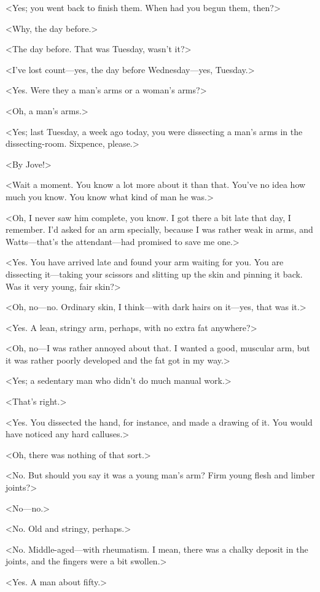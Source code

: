 <Yes; you went back to finish them. When had you begun them, then?>

<Why, the day before.>

<The day before. That was Tuesday, wasn't it?>

<I've lost count—yes, the day before Wednesday—yes, Tuesday.>

<Yes. Were they a man's arms or a woman's arms?>

<Oh, a man's arms.>

<Yes; last Tuesday, a week ago today, you were dissecting a man's arms in the dissecting-room. Sixpence, please.>

<By Jove!>

<Wait a moment. You know a lot more about it than that. You've no idea how much you know. You know what kind of man he was.>

<Oh, I never saw him complete, you know. I got there a bit late that day, I remember. I'd asked for an arm specially, because I was rather weak in arms, and Watts—that's the attendant—had promised to save me one.>

<Yes. You have arrived late and found your arm waiting for you. You are dissecting it—taking your scissors and slitting up the skin and pinning it back. Was it very young, fair skin?>

<Oh, no—no. Ordinary skin, I think—with dark hairs on it—yes, that was it.>

<Yes. A lean, stringy arm, perhaps, with no extra fat anywhere?>

<Oh, no—I was rather annoyed about that. I wanted a good, muscular arm, but it was rather poorly developed and the fat got in my way.>

<Yes; a sedentary man who didn't do much manual work.>

<That's right.>

<Yes. You dissected the hand, for instance, and made a drawing of it. You would have noticed any hard calluses.>

<Oh, there was nothing of that sort.>

<No. But should you say it was a young man's arm? Firm young flesh and limber joints?>

<No—no.>

<No. Old and stringy, perhaps.>

<No. Middle-aged—with rheumatism. I mean, there was a chalky deposit in the joints, and the fingers were a bit swollen.>

<Yes. A man about fifty.>

